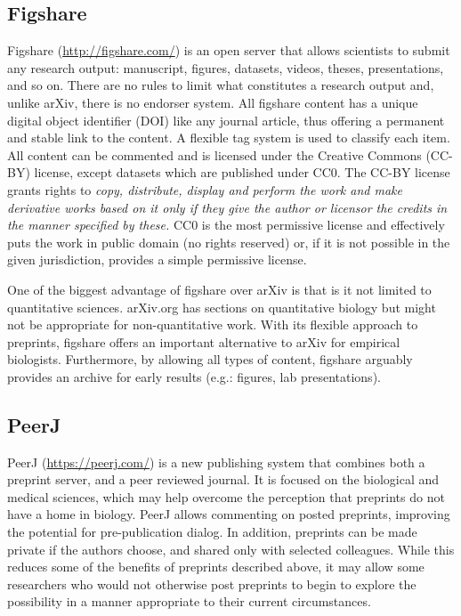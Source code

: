 \documentclass[letterpaper,twocolumn,superscriptaddress,showkeys,longbibliography]{revtex4-1}
\begin{document}
\subsection{Figshare}

Figshare (\href{http://figshare.com/}{http://figshare.com/}) is an open server
that allows scientists to submit any research output: manuscript, figures,
datasets, videos, theses, presentations, and so on. There are no rules to limit
what constitutes a research output and, unlike arXiv, there is no endorser
system. All figshare content has a unique digital object identifier (DOI) like
any journal article, thus offering a permanent and stable link to the content.
A flexible tag system is used to classify each item. All content can be
commented and is licensed under the Creative Commons (CC-BY) license, except
datasets which are published under CC0. The CC-BY license grants rights to
\emph{copy, distribute, display and perform the work and make derivative works
based on it only if they give the author or licensor the credits in the manner
specified by these.}  CC0 is the most permissive license and effectively puts
the work in public domain (no rights reserved) or, if it is not possible in the
given jurisdiction, provides a simple permissive license.

One of the biggest advantage of figshare over arXiv is that is it not limited to
quantitative sciences. arXiv.org has sections on quantitative biology but might
not be appropriate for non-quantitative work. With its flexible approach to
preprints, figshare offers an important alternative to arXiv for empirical
biologists. Furthermore, by allowing all types of content, figshare arguably
provides an archive for early results (e.g.: figures, lab presentations).

\subsection{PeerJ}

PeerJ (\href{https://peerj.com/}{https://peerj.com/}) is a new publishing system
that combines both a preprint server, and a peer reviewed journal.  It is
focused on the biological and medical sciences, which may help overcome the
perception that preprints do not have a home in biology.  PeerJ allows
commenting on posted preprints, improving the potential for pre-publication
dialog. In addition, preprints can be made private if the authors choose, and
shared only with selected colleagues. While this reduces some of the benefits of
preprints described above, it may allow some researchers who would not otherwise
post preprints to begin to explore the possibility in a manner appropriate to
their current circumstances.
\end{document}
